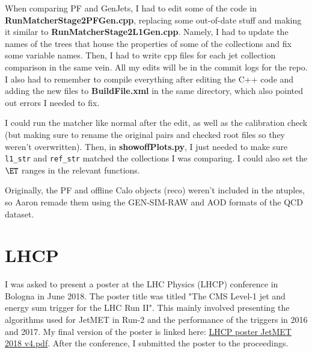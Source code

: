When comparing PF and GenJets, I had to edit some of the code in \textbf{RunMatcherStage2PFGen.cpp}, replacing some out-of-date stuff and making it similar to \textbf{RunMatcherStage2L1Gen.cpp}. Namely, I had to update the names of the trees that house the properties of some of the collections and fix some variable names. Then, I had to write cpp files for each jet collection comparison in the same vein. All my edits will be in the commit logs for the repo. I also had to remember to compile everything after editing the C++ code and adding the new files to \textbf{BuildFile.xml} in the same directory, which also pointed out errors I needed to fix.

I could run the matcher like normal after the edit, as well as the calibration check (but making sure to rename the original pairs and checked root files so they weren't overwritten). Then, in \textbf{showoffPlots.py}, I just needed to make sure \texttt{l1\_str} and \texttt{ref\_str} matched the collections I was comparing. I could also set the $\ET$ ranges in the relevant functions.

Originally, the PF and offline Calo objects (reco) weren't included in the ntuples, so Aaron remade them using the GEN-SIM-RAW and AOD formats of the QCD dataset.

\section{LHCP}

I was asked to present a poster at the LHC Physics (LHCP) conference in Bologna in June 2018. The poster title was titled "The CMS Level-1 jet and energy sum trigger for the LHC Run II". This mainly involved presenting the algorithms used for JetMET in Run-2 and the performance of the triggers in 2016 and 2017. My final version of the poster is linked here: \href{run:modules/Sec 20 - Service Work Jet Energy Corrections/figures/LHCP poster JetMET 2018 v4.pdf}{LHCP poster JetMET 2018 v4.pdf}. After the conference, I submitted the poster to the proceedings.
